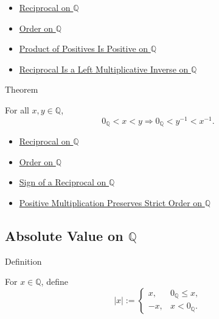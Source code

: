 \begin{dependencies}
\begin{itemize}
  \item \hyperref[def:reciprocal-on-q-classes]{Reciprocal on $\mathbb{Q}$}
  \item \hyperref[def:order-on-q]{Order on $\mathbb{Q}$}
  \item \hyperref[prop:product-of-positives-is-positive-q]{Product of Positives Is Positive on $\mathbb{Q}$}
  \item \hyperref[thm:reciprocal-left-multiplicative-inverse-on-q]{Reciprocal Is a Left Multiplicative Inverse on $\mathbb{Q}$}
\end{itemize}
\end{dependencies}

\begin{theorembox}{Theorem}
\begin{theorem}
\label{thm:reciprocal-reverses-order-on-positives-q}
For all $x,y\in\mathbb{Q}$,
\[
0_{\mathbb{Q}}<x<y
\Longrightarrow
0_{\mathbb{Q}}<y^{-1}<x^{-1}.
\]
\end{theorem}
\end{theorembox}

\begin{dependencies}
\begin{itemize}
  \item \hyperref[def:reciprocal-on-q-classes]{Reciprocal on $\mathbb{Q}$}
  \item \hyperref[def:order-on-q]{Order on $\mathbb{Q}$}
  \item \hyperref[thm:sign-of-reciprocal-q]{Sign of a Reciprocal on $\mathbb{Q}$}
  \item \hyperref[thm:positive-multiplication-preserves-strict-order-on-q]{Positive Multiplication Preserves Strict Order on $\mathbb{Q}$}
\end{itemize}
\end{dependencies}

\subsection*{\texorpdfstring{Absolute Value on $\mathbb{Q}$}{Absolute Value on Q}}

\begin{definitionbox}{Definition}
\begin{definition}
\label{def:absolute-value-on-q}
For $x\in\mathbb{Q}$, define
\[
|x|:=
\begin{cases}
x, & 0_{\mathbb{Q}}\le x,\\
-x, & x<0_{\mathbb{Q}}.
\end{cases}
\]
\end{definition}
\end{definitionbox}

